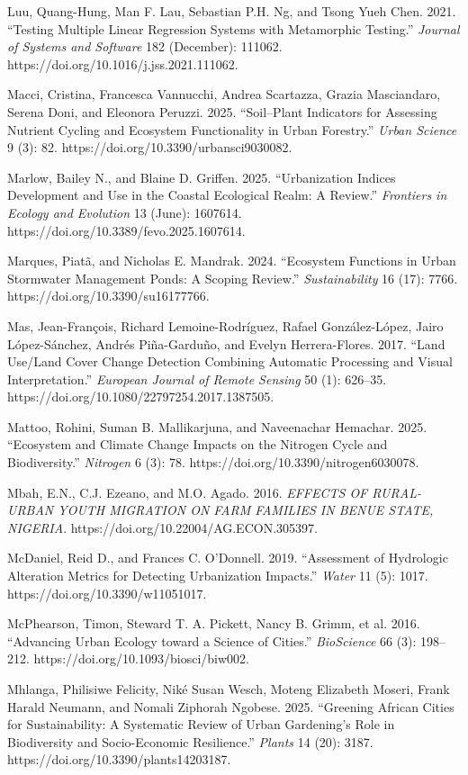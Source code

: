 Luu, Quang-Hung, Man F. Lau, Sebastian P.H. Ng, and Tsong Yueh Chen. 2021. ``Testing Multiple Linear Regression Systems with Metamorphic Testing.'' \emph{Journal of Systems and Software} 182 (December): 111062. https://doi.org/10.1016/j.jss.2021.111062.

Macci, Cristina, Francesca Vannucchi, Andrea Scartazza, Grazia Masciandaro, Serena Doni, and Eleonora Peruzzi. 2025. ``Soil--Plant Indicators for Assessing Nutrient Cycling and Ecosystem Functionality in Urban Forestry.'' \emph{Urban Science} 9 (3): 82. https://doi.org/10.3390/urbansci9030082.

Marlow, Bailey N., and Blaine D. Griffen. 2025. ``Urbanization Indices Development and Use in the Coastal Ecological Realm: A Review.'' \emph{Frontiers in Ecology and Evolution} 13 (June): 1607614. https://doi.org/10.3389/fevo.2025.1607614.

Marques, Piatã, and Nicholas E. Mandrak. 2024. ``Ecosystem Functions in Urban Stormwater Management Ponds: A Scoping Review.'' \emph{Sustainability} 16 (17): 7766. https://doi.org/10.3390/su16177766.

Mas, Jean-François, Richard Lemoine-Rodríguez, Rafael González-López, Jairo López-Sánchez, Andrés Piña-Garduño, and Evelyn Herrera-Flores. 2017. ``Land Use/Land Cover Change Detection Combining Automatic Processing and Visual Interpretation.'' \emph{European Journal of Remote Sensing} 50 (1): 626--35. https://doi.org/10.1080/22797254.2017.1387505.

Mattoo, Rohini, Suman B. Mallikarjuna, and Naveenachar Hemachar. 2025. ``Ecosystem and Climate Change Impacts on the Nitrogen Cycle and Biodiversity.'' \emph{Nitrogen} 6 (3): 78. https://doi.org/10.3390/nitrogen6030078.

Mbah, E.N., C.J. Ezeano, and M.O. Agado. 2016. \emph{EFFECTS OF RURAL-URBAN YOUTH MIGRATION ON FARM FAMILIES IN BENUE STATE, NIGERIA}. https://doi.org/10.22004/AG.ECON.305397.

McDaniel, Reid D., and Frances C. O'Donnell. 2019. ``Assessment of Hydrologic Alteration Metrics for Detecting Urbanization Impacts.'' \emph{Water} 11 (5): 1017. https://doi.org/10.3390/w11051017.

McPhearson, Timon, Steward T. A. Pickett, Nancy B. Grimm, et al. 2016. ``Advancing Urban Ecology toward a Science of Cities.'' \emph{BioScience} 66 (3): 198--212. https://doi.org/10.1093/biosci/biw002.

Mhlanga, Philisiwe Felicity, Niké Susan Wesch, Moteng Elizabeth Moseri, Frank Harald Neumann, and Nomali Ziphorah Ngobese. 2025. ``Greening African Cities for Sustainability: A Systematic Review of Urban Gardening's Role in Biodiversity and Socio-Economic Resilience.'' \emph{Plants} 14 (20): 3187. https://doi.org/10.3390/plants14203187.

